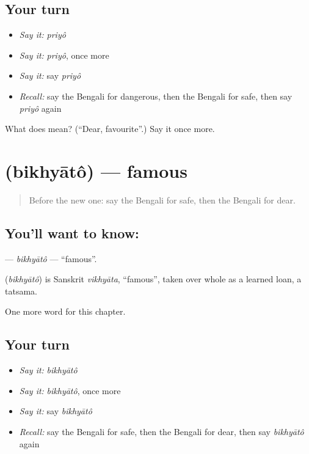 \subsection*{Your turn}
\begin{itemize}
\raggedright
  \item \emph{Say it:} \emph{priyô}
  \item \emph{Say it:} \emph{priyô}, once more
  \item \emph{Say it:} say \emph{priyô}
  \item \emph{Recall:} say the Bengali for dangerous, then the Bengali for safe, then say \emph{priyô} again
\end{itemize}

\begin{tcolorbox}[breakable,colback=teal!4,colframe=teal!35!black,title={Before you move on}]
What does  mean? (\textquotedblleft{}Dear, favourite\textquotedblright{}.) Say it once more.
\end{tcolorbox}
\section[\texorpdfstring{\bn{বিখ্যাত} (bikhyātô)}{বিখ্যাত (bikhyātô)}]{ (bikhyātô) — famous}

\label{lesson:BN-C142-bikhyato}



\begin{quote}
Before the new one: say the Bengali for safe, then the Bengali for dear.
\end{quote}

\subsection*{You'll want to know: }
\textbf{} — \emph{bikhyātô} — \textquotedblleft{}famous\textquotedblright{}.

\begin{cousinweb}
\textbf{} (\emph{bikhyātô}) is Sanskrit \emph{vikhyāta}, \textquotedblleft{}famous\textquotedblright{}, taken over whole as a learned loan, a tatsama.
\end{cousinweb}

\begin{grammarlens}[title={What you've built}]
One more word for this chapter.
\end{grammarlens}

\subsection*{Your turn}
\begin{itemize}
\raggedright
  \item \emph{Say it:} \emph{bikhyātô}
  \item \emph{Say it:} \emph{bikhyātô}, once more
  \item \emph{Say it:} say \emph{bikhyātô}
  \item \emph{Recall:} say the Bengali for safe, then the Bengali for dear, then say \emph{bikhyātô} again
\end{itemize}

